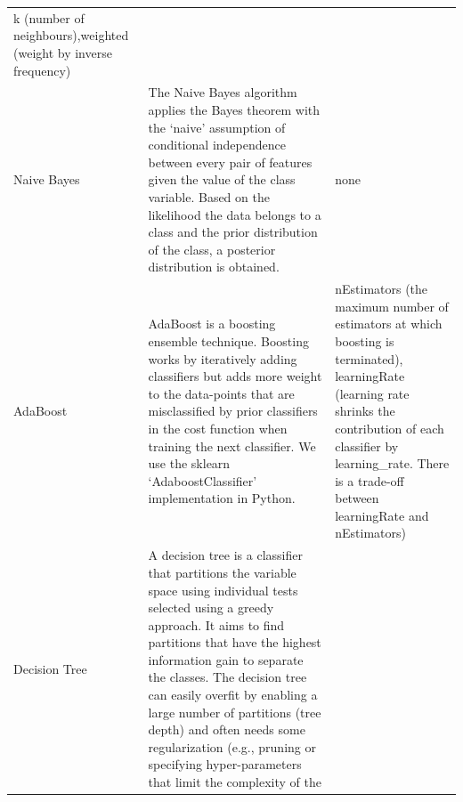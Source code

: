 \documentclass[
]{article}
\begin{document}
\begin{longtable}[]{@{}lll@{}}
\begin{minipage}[t]{0.25\columnwidth}
k (number of neighbours),weighted (weight by inverse frequency)\strut
\end{minipage}\tabularnewline
\begin{minipage}[t]{0.11\columnwidth}\raggedright
Naive Bayes\strut
\end{minipage} & \begin{minipage}[t]{0.55\columnwidth}\raggedright
The Naive Bayes algorithm applies the Bayes theorem with the `naive'
assumption of conditional independence between every pair of features
given the value of the class variable. Based on the likelihood the data
belongs to a class and the prior distribution of the class, a posterior
distribution is obtained.\strut
\end{minipage} & \begin{minipage}[t]{0.25\columnwidth}\raggedright
none\strut
\end{minipage}\tabularnewline
\begin{minipage}[t]{0.11\columnwidth}\raggedright
AdaBoost\strut
\end{minipage} & \begin{minipage}[t]{0.55\columnwidth}\raggedright
AdaBoost is a boosting ensemble technique. Boosting works by iteratively
adding classifiers but adds more weight to the data-points that are
misclassified by prior classifiers in the cost function when training
the next classifier. We use the sklearn `AdaboostClassifier'
implementation in Python.\strut
\end{minipage} & \begin{minipage}[t]{0.25\columnwidth}\raggedright
nEstimators (the maximum number of estimators at which boosting is
terminated), learningRate (learning rate shrinks the contribution of
each classifier by learning\_rate. There is a trade-off between
learningRate and nEstimators)\strut
\end{minipage}\tabularnewline
\begin{minipage}[t]{0.11\columnwidth}\raggedright
Decision Tree\strut
\end{minipage} & \begin{minipage}[t]{0.55\columnwidth}\raggedright
A decision tree is a classifier that partitions the variable space using
individual tests selected using a greedy approach. It aims to find
partitions that have the highest information gain to separate the
classes. The decision tree can easily overfit by enabling a large number
of partitions (tree depth) and often needs some regularization (e.g.,
pruning or specifying hyper-parameters that limit the complexity of the

\end{minipage}
\end{longtable}
\end{document}
